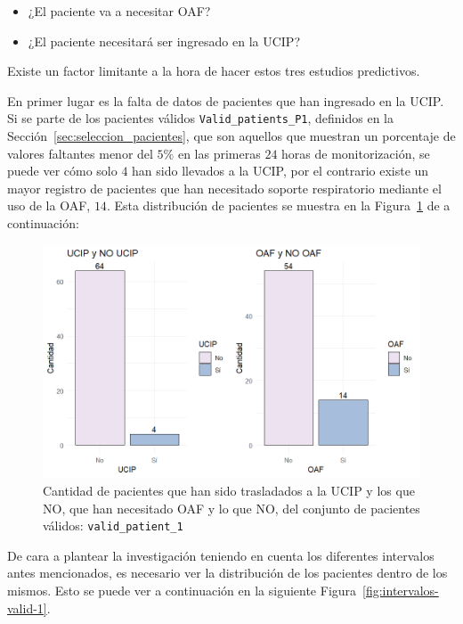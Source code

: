 \begin{itemize}
    \item ¿El paciente va a necesitar OAF?
    \item ¿El paciente necesitará ser ingresado en la UCIP?
\end{itemize}

Existe un factor limitante a la hora de hacer estos tres estudios predictivos.

En primer lugar es la falta de datos de pacientes que han ingresado en la UCIP. Si se parte de los pacientes válidos \texttt{Valid\_patients\_P1}, definidos en la Sección~\ref{sec:seleccion_pacientes}, que son aquellos que muestran un porcentaje de valores faltantes menor del $5\%$ en las primeras $24$ horas de monitorización, se puede ver cómo solo $4$ han sido llevados a la UCIP, por el contrario existe un mayor registro de pacientes que han necesitado soporte respiratorio mediante el uso de la OAF, $14$. Esta distribución de pacientes se muestra en la Figura~\ref{fig:bar-OAF-UCIP-valid-1} de a continuación: 

\begin{figure}[H]
    \centering
    \includegraphics[scale = 0.9]{./img/bar-OAF-UCIP-valid-1.png}
    \caption{Cantidad de pacientes que han sido trasladados a la UCIP y los que NO, que han necesitado OAF y lo que NO, del conjunto de pacientes válidos: \texttt{valid\_patient\_1}}
    \label{fig:bar-OAF-UCIP-valid-1}
\end{figure}

De cara a plantear la investigación teniendo en cuenta los diferentes intervalos antes mencionados, es necesario ver la distribución de los pacientes dentro de los mismos. Esto se puede ver a continuación en la siguiente Figura~\ref{fig:intervalos-valid-1}.


